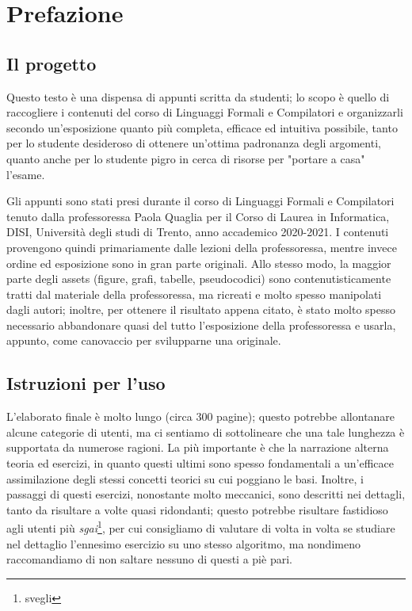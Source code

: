 \documentclass[class=book, crop=false, oneside, 12pt]{standalone}
\begin{document}
\chapter*{Prefazione}

\section*{Il progetto}
Questo testo è una dispensa di appunti scritta da studenti; lo scopo è quello di raccogliere i contenuti del corso di Linguaggi Formali e Compilatori e organizzarli secondo un'esposizione quanto più completa, efficace ed intuitiva possibile, tanto per lo studente desideroso di ottenere un'ottima padronanza degli argomenti, quanto anche per lo studente pigro in cerca di risorse per "portare a casa" l'esame.

Gli appunti sono stati presi durante il corso di Linguaggi Formali e Compilatori tenuto dalla professoressa Paola Quaglia per il Corso di Laurea in Informatica, DISI, Università degli studi di Trento, anno accademico 2020-2021. I contenuti provengono quindi primariamente dalle lezioni della professoressa, mentre invece ordine ed esposizione sono in gran parte originali. Allo stesso modo, la maggior parte degli assets (figure, grafi, tabelle, pseudocodici) sono contenutisticamente tratti dal materiale della professoressa, ma ricreati e molto spesso manipolati dagli autori; inoltre, per ottenere il risultato appena citato, è stato molto spesso necessario abbandonare quasi del tutto l'esposizione della professoressa e usarla, appunto, come canovaccio per svilupparne una originale.

\section*{Istruzioni per l'uso}
L'elaborato finale è molto lungo (circa 300 pagine); questo potrebbe allontanare alcune categorie di utenti, ma ci sentiamo di sottolineare che una tale lunghezza è supportata da numerose ragioni. La più importante è che la narrazione alterna teoria ed esercizi, in quanto questi ultimi sono spesso fondamentali a un'efficace assimilazione degli stessi concetti teorici su cui poggiano le basi. Inoltre, i passaggi di questi esercizi, nonostante molto meccanici, sono descritti nei dettagli, tanto da risultare a volte quasi ridondanti; questo potrebbe risultare fastidioso agli utenti più \emph{sgai}\footnote{svegli}, per cui consigliamo di valutare di volta in volta se studiare nel dettaglio l'ennesimo esercizio su uno stesso algoritmo, ma nondimeno raccomandiamo di non saltare nessuno di questi a piè pari. 
\end{document}
